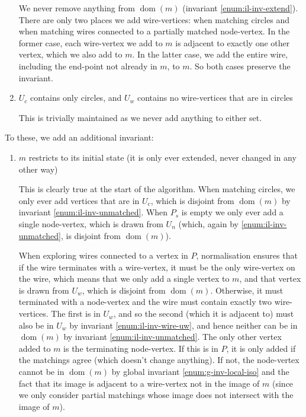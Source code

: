 \documentclass{article}
\DeclareMathOperator{\dom}{dom}
\begin{document}
\begin{enumerate}[label=(\roman*),ref=(\roman*)]
  We never remove anything from $\dom(m)$ (invariant \ref{enum:il-inv-extend}).  There are only two places we add wire-vertices: when matching circles and when matching wires connected to a partially matched node-vertex.  In the former case, each wire-vertex we add to $m$ is adjacent to exactly one other vertex, which we also add to $m$.  In the latter case, we add the entire wire, including the end-point not already in $m$, to $m$.  So both cases preserve the invariant.
  \item $U_c$ contains only circles, and $U_w$ contains no wire-vertices that are in circles

  This is trivially maintained as we never add anything to either set.
\end{enumerate}

To these, we add an additional invariant:
\begin{enumerate}[resume*]
  \item \label{enum:il-inv-extend} $m$ restricts to its initial state (it is only ever extended, never changed in any other way)

  This is clearly true at the start of the algorithm.  When matching circles, we only ever add vertices that are in $U_c$, which is disjoint from $\dom(m)$ by invariant \ref{enum:il-inv-unmatched}.  When $P_s$ is empty we only ever add a single node-vertex, which is drawn from $U_n$ (which, again by \ref{enum:il-inv-unmatched}, is disjoint from $\dom(m)$).

  When exploring wires connected to a vertex in $P$, normalisation ensures that if the wire terminates with a wire-vertex, it must be the only wire-vertex on the wire, which means that we only add a single vertex to $m$, and that vertex is drawn from $U_w$, which is disjoint from $\dom(m)$.  Otherwise, it must terminated with a node-vertex and the wire must contain exactly two wire-vertices.  The first is in $U_w$, and so the second (which it is adjacent to) must also be in $U_w$ by invariant \ref{enum:il-inv-wire-uw}, and hence neither can be in $\dom(m)$ by invariant \ref{enum:il-inv-unmatched}.  The only other vertex added to $m$ is the terminating node-vertex.  If this is in $P$, it is only added if the matchings agree (which doesn't change anything).  If not, the node-vertex cannot be in $\dom(m)$ by global invariant \ref{enum:g-inv-local-iso} and the fact that its image is adjacent to a wire-vertex not in the image of $m$ (since we only consider partial matchings whose image does not intersect with the image of $m$).
\end{enumerate}
\end{document}

